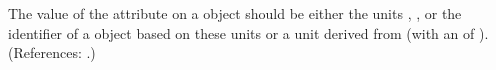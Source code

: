 The value of the attribute  on a \Model object should be
either the units , , or the identifier of a
\UnitDefinition object based on these units or a unit derived from
 (with an  of ).  (References: .)
